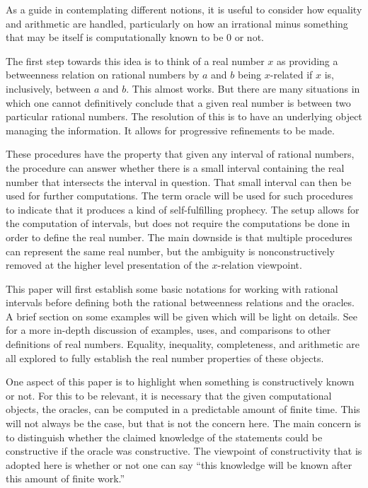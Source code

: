 \documentclass[12pt]{article}
\begin{document}
As a guide in contemplating different notions, it is useful to consider how equality and arithmetic are handled, particularly on how an irrational minus something that may be itself is computationally known to be 0 or not. 

The first step towards this idea is to think of a real number $x$ as providing a betweenness relation on rational numbers by $a$ and $b$ being $x$-related if $x$ is, inclusively, between $a$ and $b$. This almost works. But there are many situations in which one cannot definitively conclude that a given real number is between two particular rational numbers. The resolution of this is to have an underlying object managing the information. It allows for progressive refinements to be made. 

These procedures have the property that given any interval of rational numbers, the procedure can answer whether there is a small interval containing the real number that intersects the interval in question. That small interval can then be used for further computations. The term oracle will be used for such procedures to indicate that it produces a kind of self-fulfilling prophecy. The setup allows for the computation of intervals, but does not require the computations be done in order to define the real number. The main downside is that multiple procedures can represent the same real number, but the ambiguity is nonconstructively removed at the higher level presentation of the $x$-relation viewpoint.  

This paper will first establish some basic notations for working with rational intervals before defining both the rational betweenness relations and the oracles. A brief section on some examples will be given which will be light on details. See \cite{taylor23main} for a more in-depth discussion of examples, uses, and comparisons to other definitions of real numbers. Equality, inequality, completeness, and arithmetic are all explored to fully establish the real number properties of these objects. 

One aspect of this paper is to highlight when something is constructively known or not. For this to be relevant, it is necessary that the given computational objects, the oracles, can be computed in a predictable amount of finite time. This will not always be the case, but that is not the concern here. The main concern is to distinguish whether the claimed knowledge of the statements could be constructive if the oracle was constructive. The viewpoint of constructivity that is adopted here is whether or not one can say ``this knowledge will be known after this amount of finite work.'' 
\end{document}
